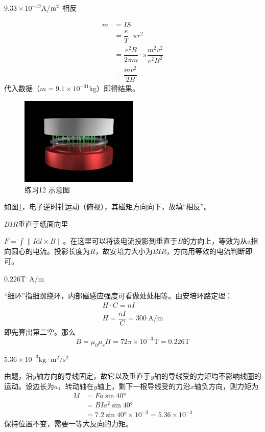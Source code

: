 \documentclass[b5paper,opensource,sourcefont,parskip]{qyxf-book}
\newcommand{\di}[1]{\mathrm{d}#1}
\begin{document}
$9.33\times 10^{-19}$A/$\rm{m}^2$ \quad 相反

\solve
\begin{align*}
m&=IS\\
&=\dfrac{e}{T}\cdot \pi r^2\\
&=\dfrac{e^2B}{2\pi m}\cdot \pi\dfrac{m^2v^2}{e^2B^2}\\
&=\dfrac{mv^2}{2B}
\end{align*}
代入数据（$m=9.1\times 10^{-31}$kg）即得结果。
\begin{figure}[!h]	
	\centering	
	\includegraphics[width=0.5\textwidth]{Chp9_illus1.png}	
	\caption{练习12 示意图}\label{fig:c9-t12}
\end{figure}
如图\ref{fig:c9-t12}，电子逆时针运动（俯视），其磁矩方向向下，故填“相反”。

$BIR$\quad 垂直于纸面向里

\solve
$F=\int \|I\di{l}\times B\|$。在这里可以将该电流投影到垂直于$B$的方向上，等效为从a指向圆心的电流。投影长度为$R$，故安培力大小为$BIR$，方向用等效的电流判断即可。

$0.226\textrm{T}$\ \textrm{A/m}

\solve
“细环”指细螺绕环，内部磁感应强度可看做处处相等。由安培环路定理：
\begin{gather*}
H\cdot C=nI\\
H=\dfrac{nI}{C}=300\ \textrm{A/m}
\end{gather*}
即先算出第二空。那么
\[
B=\mu_0\mu_rH=72\pi\times 10^{-3}\textrm{T}=0.226\textrm{T}
\]

$5.36\times 10^{-3}\textrm{kg}\cdot \textrm{m}^2/\textrm{s}^2$

\solve
由题，沿$y$轴方向的导线固定，故它以及垂直于$y$轴的导线受的力矩均不影响线圈的运动。设边长为$a$，转动轴在$y$轴上，剩下一根导线受的力沿$x$轴负方向，则力矩为
\begin{align*}
M&=Fa\sin\ang{40}\\
&=BIa^2\sin\ang{40}\\
&=7.2\sin\ang{40}\times 10^{-3}=5.36\times 10^{-3}
\end{align*}
保持位置不变，需要一等大反向的力矩。
\end{document}
